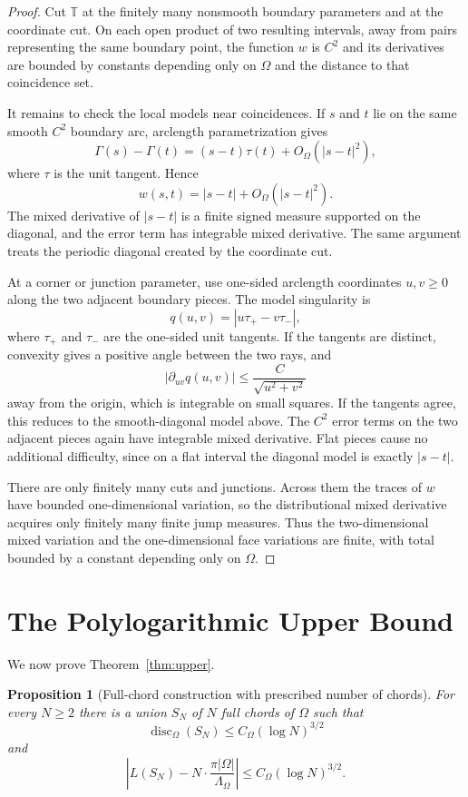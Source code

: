 \documentclass[11pt]{article}
\newtheorem{proposition}[theorem]{Proposition}
\theoremstyle{definition}
\newcommand{\T}{\mathbb T}
\newcommand{\disc}{\operatorname{disc}}
\begin{document}
\begin{proof}
Cut $\T$ at the finitely many nonsmooth boundary parameters and at the coordinate cut.  On each open product of two resulting intervals, away from pairs representing the same boundary point, the function $w$ is $C^2$ and its derivatives are bounded by constants depending only on $\Omega$ and the distance to that coincidence set.

\bigskip
\noindent
It remains to check the local models near coincidences.  If $s$ and $t$ lie on the same smooth $C^2$ boundary arc, arclength parametrization gives
\[
        \Gamma(s)-\Gamma(t)=(s-t)\tau(t)+O_\Omega(|s-t|^2),
\]
where $\tau$ is the unit tangent.  Hence
\[
        w(s,t)=|s-t|+O_\Omega(|s-t|^2).
\]
The mixed derivative of $|s-t|$ is a finite signed measure supported on the diagonal, and the error term has integrable mixed derivative.  The same argument treats the periodic diagonal created by the coordinate cut.

\bigskip
\noindent
At a corner or junction parameter, use one-sided arclength coordinates $u,v\ge0$ along the two adjacent boundary pieces.  The model singularity is
\[
        q(u,v)=|u\tau_+ - v\tau_-|,
\]
where $\tau_+$ and $\tau_-$ are the one-sided unit tangents.  If the tangents are distinct, convexity gives a positive angle between the two rays, and
\[
        |\partial_{uv}q(u,v)|\le \frac{C}{\sqrt{u^2+v^2}}
\]
away from the origin, which is integrable on small squares.  If the tangents agree, this reduces to the smooth-diagonal model above.  The $C^2$ error terms on the two adjacent pieces again have integrable mixed derivative.  Flat pieces cause no additional difficulty, since on a flat interval the diagonal model is exactly $|s-t|$.

\bigskip
\noindent
There are only finitely many cuts and junctions.  Across them the traces of $w$ have bounded one-dimensional variation, so the distributional mixed derivative acquires only finitely many finite jump measures.  Thus the two-dimensional mixed variation and the one-dimensional face variations are finite, with total bounded by a constant depending only on $\Omega$.
\end{proof}

\section{The Polylogarithmic Upper Bound}

We now prove Theorem~\ref{thm:upper}.

\begin{proposition}[Full-chord construction with prescribed number of chords]\label{prop:N-upper}
For every $N\ge2$ there is a union $S_N$ of $N$ full chords of $\Omega$ such that
\[
        \disc_\Omega(S_N)
        \le C_\Omega(\log N)^{3/2}
\]
and
\[
        \left|L(S_N)-N\cdot\frac{\pi|\Omega|}{\Lambda_\Omega}\right|
        \le C_\Omega(\log N)^{3/2}.
\]
\end{proposition}
\end{document}
